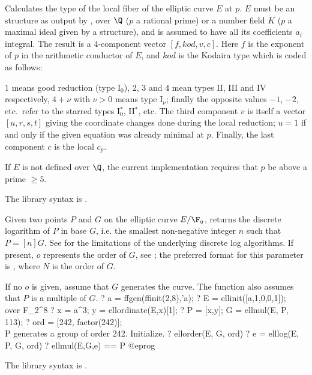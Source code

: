 \label{se:elllocalred}
Calculates the  type of the local fiber of the elliptic curve
$E$ at $p$. $E$ must be an  structure as output by
, over $\Q$ ($p$ a rational prime) or a number field $K$ ($p$
a maximal ideal given by a  structure), and is assumed to have all
its coefficients $a_i$ integral.
The result is a 4-component vector $[f,kod,v,c]$. Here $f$ is the exponent of
$p$ in the arithmetic conductor of $E$, and $kod$ is the Kodaira type which
is coded as follows:

1 means good reduction (type I$_0$), 2, 3 and 4 mean types II, III and IV
respectively, $4+\nu$ with $\nu>0$ means type I$_\nu$;
finally the opposite values $-1$, $-2$, etc.~refer to the starred types
I$_0^*$, II$^*$, etc. The third component $v$ is itself a vector $[u,r,s,t]$
giving the coordinate changes done during the local reduction;
$u = 1$ if and only if the given equation was already minimal at $p$.
Finally, the last component $c$ is the local  $c_p$.

 If $E$ is not defined over $\Q$, the current
implementation requires that $p$ be above a prime $\geq 5$.

The library syntax is .

\label{se:elllog}
Given two points $P$ and $G$ on the elliptic curve $E/\F_q$, returns the
discrete logarithm of $P$ in base $G$, i.e. the smallest non-negative
integer $n$ such that $P = [n]G$.
See  for the limitations of the underlying discrete log algorithms.
If present, $o$ represents the order of $G$, see ;
the preferred format for this parameter is \kbd{[N, factor(N)]}, where $N$
is  the order of $G$.

If no $o$ is given, assume that $G$ generates the curve.
The function also assumes that $P$ is a multiple of $G$.
\bprog
? a = ffgen(ffinit(2,8),'a);
? E = ellinit([a,1,0,0,1]);  \\ over F_{2^8}
? x = a^3; y = ellordinate(E,x)[1];
? P = [x,y]; G = ellmul(E, P, 113);
? ord = [242, factor(242)]; \\ P generates a group of order 242. Initialize.
? ellorder(E, G, ord)
? e = elllog(E, P, G, ord)
? ellmul(E,G,e) == P
@eprog

The library syntax is .

